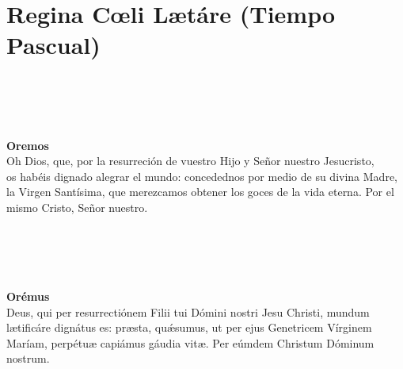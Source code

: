 \documentclass[./L00_main.tex]{subfiles}
\begin{document}
\section*{Regina C{\oe}li L{\ae}táre (Tiempo Pascual)}

\begin{minipage}[t]{0.475\textwidth}
    \\
    \\
    \\\\
    \textbf{Oremos}\\
    Oh Dios, que, por la resurreción de vuestro Hijo y Señor nuestro Jesucristo,\\
    os habéis dignado alegrar el mundo: concedednos por medio de su divina Madre, la Virgen Santísima,
    que merezcamos obtener los goces de la vida eterna. Por el mismo Cristo, Señor nuestro.  
\end{minipage}
\begin{minipage}[t]{0.475\textwidth}
    \\
    \\
    \\\\
    \textbf{Orémus}\\
    Deus, qui per resurrectiónem Filii tui Dómini nostri Jesu Christi,
    mundum l{\ae}tificáre dignátus es: pr{\ae}sta, qu{\'\ae}sumus, ut per ejus Genetricem Vírginem Maríam,
    perpétu{\ae} capiámus gáudia vit{\ae}. Per eúmdem Christum Dóminum nostrum. 
\end{minipage}
\end{document}
